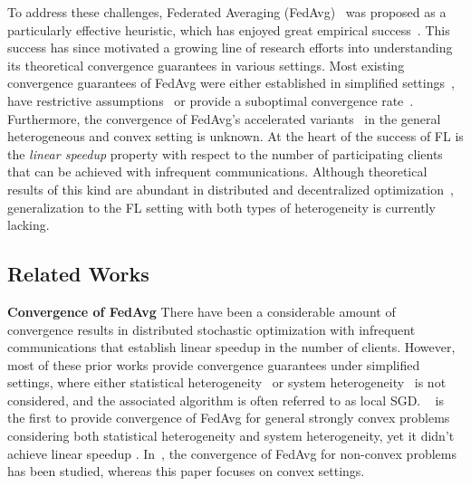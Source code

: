 To address these challenges, Federated Averaging (FedAvg)~\cite{mcmahan2016communication} was proposed as a particularly effective heuristic, which has enjoyed great empirical success~\cite{47586}. This success has since motivated a growing line of research efforts into understanding its theoretical convergence guarantees in various settings. Most existing convergence guarantees of FedAvg were either established in simplified settings~\cite{stich2018local,khaled2019first,wang2018cooperative,yu2019parallel,khaled2020tighter,li2018federated,koloskova2020unified}, have restrictive assumptions~\cite{haddadpour2019convergence} or provide a suboptimal 
convergence rate~\cite{li2019convergence}. Furthermore, the convergence of
FedAvg's accelerated variants~\cite{yu2019linear,huo2020faster,liu2019accelerating} in the general heterogeneous and convex setting is unknown. At the heart of the success of FL is the \emph{linear speedup} property with respect to the number of participating clients that can be achieved with infrequent communications. Although theoretical results of this kind are abundant in distributed and decentralized optimization~\cite{yu2019linear,yu2019parallel,stich2018local,khaled2020tighter,koloskova2020unified}, generalization to the FL setting with both types of heterogeneity is currently lacking.

\subsection{Related Works}
\textbf{Convergence of FedAvg}
There have been a considerable amount of convergence results in distributed stochastic optimization with infrequent communications that establish linear speedup in the number of clients. However, most of these prior works provide
convergence guarantees under simplified settings, where either statistical
heterogeneity~\cite{stich2018local,zhou2017convergence,wang2018cooperative,woodworth2018graph,haddadpour2019convergence} or system
heterogeneity~\cite{yu2019parallel,wang2019adaptive,khaled2019first,jiang2018linear,koloskova2020unified} is not
considered, and the associated algorithm is often referred to as local SGD. ~\cite{li2019convergence} is the first to provide convergence of FedAvg for general strongly convex problems considering both statistical heterogeneity and system heterogeneity, yet it
didn't achieve linear speedup \cite{yu2019parallel,haddadpour2019convergence,stich2018local}. In~\cite{haddadpour2019convergence,liang2019variance,huo2020faster,jiang2018linear}, the convergence of FedAvg for non-convex problems has been studied, whereas this paper focuses on convex settings.
\begin{comment}
However, \cite{huo2020faster} did not discuss the linear speedup and the theorems in \cite{haddadpour2019convergence,liang2019variance} failed to cover the accelerated version of
FedAvg. 
\end{comment}

